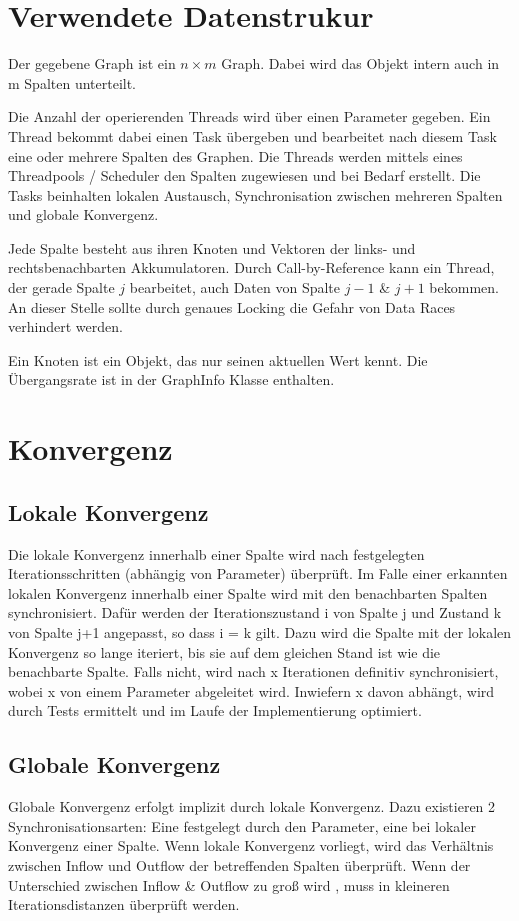 \section{Verwendete Datenstrukur}
Der gegebene Graph ist ein $n\times m$ Graph. Dabei wird das Objekt intern auch in m Spalten unterteilt. 

Die Anzahl der operierenden Threads wird über einen Parameter gegeben. Ein Thread bekommt dabei einen Task übergeben und bearbeitet nach diesem Task eine oder mehrere Spalten des Graphen. Die Threads werden mittels eines Threadpools / Scheduler den Spalten zugewiesen und bei Bedarf erstellt. Die Tasks beinhalten lokalen Austausch, Synchronisation zwischen mehreren Spalten und globale Konvergenz.

Jede Spalte besteht aus ihren Knoten und Vektoren der links- und rechtsbenachbarten Akkumulatoren. Durch Call-by-Reference kann ein Thread, der gerade Spalte $j$ bearbeitet, auch Daten von Spalte $j-1$ \& $j+1$ bekommen. An dieser Stelle sollte durch genaues Locking die Gefahr von Data Races verhindert werden. 

Ein Knoten ist ein Objekt, das nur seinen aktuellen Wert kennt. Die Übergangsrate ist in der GraphInfo Klasse enthalten. 

\section{Konvergenz}
\subsection{Lokale Konvergenz}
Die lokale Konvergenz innerhalb einer Spalte wird nach festgelegten Iterationsschritten (abhängig von Parameter) überprüft. Im Falle einer erkannten lokalen Konvergenz innerhalb einer Spalte wird mit den benachbarten Spalten synchronisiert. Dafür werden der Iterationszustand i von Spalte j und  Zustand k von Spalte j+1 angepasst, so dass i = k gilt. Dazu wird die Spalte mit der lokalen Konvergenz so lange iteriert, bis sie auf dem gleichen Stand ist wie die benachbarte Spalte. Falls nicht, wird nach x Iterationen definitiv synchronisiert, wobei x von einem Parameter abgeleitet wird. Inwiefern x davon abhängt, wird durch Tests ermittelt und im Laufe der Implementierung optimiert. 

\subsection{Globale Konvergenz}
Globale Konvergenz erfolgt implizit durch lokale Konvergenz. Dazu existieren 2 Synchronisationsarten: Eine festgelegt durch den Parameter, eine bei lokaler Konvergenz einer Spalte.
Wenn lokale Konvergenz vorliegt, wird das Verhältnis zwischen Inflow und Outflow der betreffenden Spalten überprüft. Wenn der  Unterschied zwischen Inflow \& Outflow zu groß wird , muss in kleineren Iterationsdistanzen überprüft werden. 


